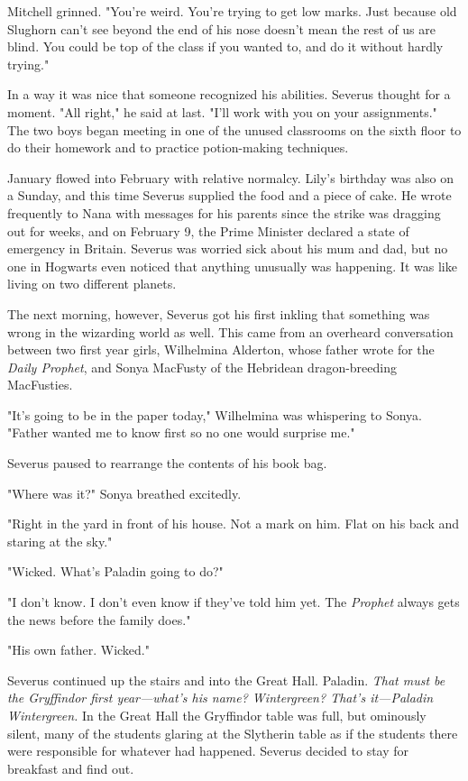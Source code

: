 Mitchell grinned. "You're weird. You're trying to get low marks. Just because old Slughorn can't see beyond the end of his nose doesn't mean the rest of us are blind. You could be top of the class if you wanted to, and do it without hardly trying."

In a way it was nice that someone recognized his abilities. Severus thought for a moment. "All right," he said at last. "I'll work with you on your assignments." The two boys began meeting in one of the unused classrooms on the sixth floor to do their homework and to practice potion-making techniques.

January flowed into February with relative normalcy. Lily's birthday was also on a Sunday, and this time Severus supplied the food and a piece of cake. He wrote frequently to Nana with messages for his parents since the strike was dragging out for weeks, and on February 9, the Prime Minister declared a state of emergency in Britain. Severus was worried sick about his mum and dad, but no one in Hogwarts even noticed that anything unusually was happening. It was like living on two different planets.

The next morning, however, Severus got his first inkling that something was wrong in the wizarding world as well. This came from an overheard conversation between two first year girls, Wilhelmina Alderton, whose father wrote for the \emph{Daily Prophet}, and Sonya MacFusty of the Hebridean dragon-breeding MacFusties.

"It's going to be in the paper today," Wilhelmina was whispering to Sonya. "Father wanted me to know first so no one would surprise me."

Severus paused to rearrange the contents of his book bag.

"Where was it?" Sonya breathed excitedly.

"Right in the yard in front of his house. Not a mark on him. Flat on his back and staring at the sky."

"Wicked. What's Paladin going to do?"

"I don't know. I don't even know if they've told him yet. The \emph{Prophet} always gets the news before the family does."

"His own father. Wicked."

Severus continued up the stairs and into the Great Hall. Paladin. \emph{That must be the Gryffindor first year—what's his name? Wintergreen? That's it—Paladin Wintergreen.} In the Great Hall the Gryffindor table was full, but ominously silent, many of the students glaring at the Slytherin table as if the students there were responsible for whatever had happened. Severus decided to stay for breakfast and find out.

